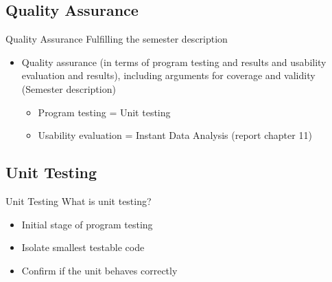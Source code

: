 \subsection{Quality Assurance}

\begin{frame}[fragile] {Quality Assurance} {Fulfilling the semester description}
	\begin{itemize}
		\item Quality assurance (in terms of program testing and results and usability evaluation and results), including arguments for coverage and validity {\footnotesize (Semester description)}
		\begin{itemize}
			\item Program testing = Unit testing
			\item Usability evaluation = Instant Data Analysis (report chapter 11)
		\end{itemize}				
	\end{itemize}

\end{frame}

\subsection{Unit Testing}

\begin{frame}[fragile] {Unit Testing} {What is unit testing?}
	\begin{itemize}
		\item Initial stage of program testing
		\item Isolate smallest testable code
		\item Confirm if the unit behaves correctly
	\end{itemize}
\end{frame}

